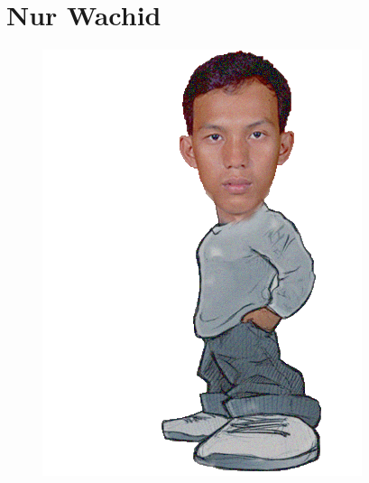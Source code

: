 \section*{Nur Wachid}

\begin{figure}
\centering
\includegraphics[width=0.7\linewidth, height=0.7\textheight]{images/wachid}
\caption{}
\label{fig:wachid}
\end{figure}
